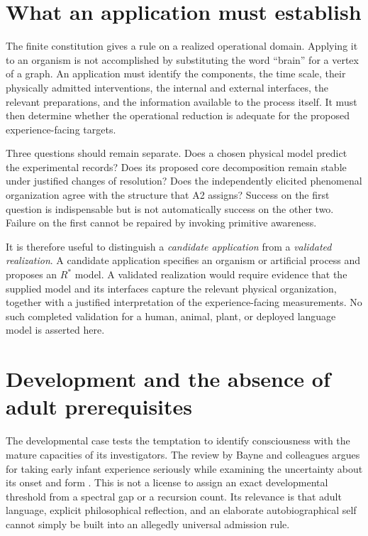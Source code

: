 \section{What an application must establish}\label{section:comparative:what-an-application-must-establish}
The finite constitution gives a rule on a realized operational domain. Applying it to an organism is not accomplished by substituting the word ``brain'' for a vertex of a graph. An application must identify the components, the time scale, their physically admitted interventions, the internal and external interfaces, the relevant preparations, and the information available to the process itself. It must then determine whether the operational reduction is adequate for the proposed experience-facing targets.

Three questions should remain separate. Does a chosen physical model predict the experimental records? Does its proposed core decomposition remain stable under justified changes of resolution? Does the independently elicited phenomenal organization agree with the structure that A2 assigns? Success on the first question is indispensable but is not automatically success on the other two. Failure on the first cannot be repaired by invoking primitive awareness.

It is therefore useful to distinguish a \emph{candidate application} from a \emph{validated realization}. A candidate application specifies an organism or artificial process and proposes an $R^\ast$ model. A validated realization would require evidence that the supplied model and its interfaces capture the relevant physical organization, together with a justified interpretation of the experience-facing measurements. No such completed validation for a human, animal, plant, or deployed language model is asserted here.

\section{Development and the absence of adult prerequisites}\label{section:comparative:development-and-the-absence-of-adult-prerequisites}
The developmental case tests the temptation to identify consciousness with the mature capacities of its investigators. The review by Bayne and colleagues argues for taking early infant experience seriously while examining the uncertainty about its onset and form \cite{Bayne2023}. This is not a license to assign an exact developmental threshold from a spectral gap or a recursion count. Its relevance is that adult language, explicit philosophical reflection, and an elaborate autobiographical self cannot simply be built into an allegedly universal admission rule.

